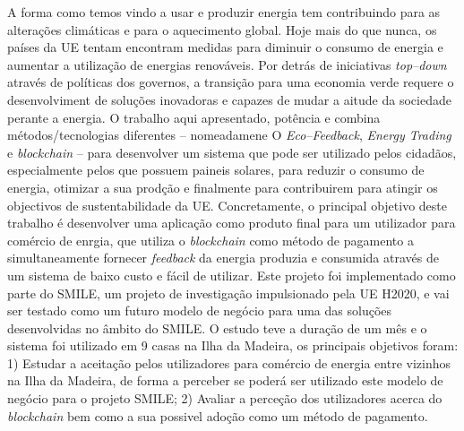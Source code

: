 \noindent 
A forma como temos vindo a usar e produzir energia tem contribuindo para as alterações climáticas e para o aquecimento global. 
Hoje mais do que nunca, os países da \ac{UE} tentam encontram medidas para diminuir o consumo de energia e aumentar a utilização de energias renováveis. Por detrás de iniciativas \textit{top--down} através de políticas dos governos, a transição para uma economia verde requere o desenvolviment de soluções inovadoras e capazes de mudar a aitude da sociedade perante a energia. O trabalho aqui apresentado, potência e combina métodos/tecnologias diferentes -- nomeadamene O \textit{Eco--Feedback}, \textit{Energy Trading} e  \textit{blockchain} -- para desenvolver um sistema que pode ser utilizado pelos cidadãos, especialmente pelos que possuem paineis solares, para reduzir o consumo de energia, otimizar a sua prodção e finalmente para contribuirem para atingir os objectivos de sustentabilidade da \ac{UE}. 
Concretamente, o principal objetivo deste trabalho é desenvolver uma aplicação como produto final para um utilizador para comércio de enrgia, que utiliza o \textit{blockchain} como método de pagamento a simultaneamente fornecer \textit{feedback} da energia produzia e consumida através de um sistema de baixo custo e fácil de utilizar.
Este projeto foi implementado como parte do \ac{SMILE}, um projeto de investigação impulsionado pela \ac{UE} H2020, e vai ser testado como um futuro modelo de negócio para uma das soluções desenvolvidas no âmbito do \ac{SMILE}. 
O estudo teve a duração de um mês e o sistema foi utilizado em 9 casas na Ilha da Madeira, os principais objetivos foram: 1) Estudar a aceitação pelos utilizadores para comércio de energia entre vizinhos na Ilha da Madeira, de forma a perceber se poderá ser utilizado este modelo de negócio para o projeto \ac{SMILE}; 2) Avaliar a perceção dos utilizadores acerca do \textit{blockchain} bem como a sua possivel adoção como um método de pagamento. 
